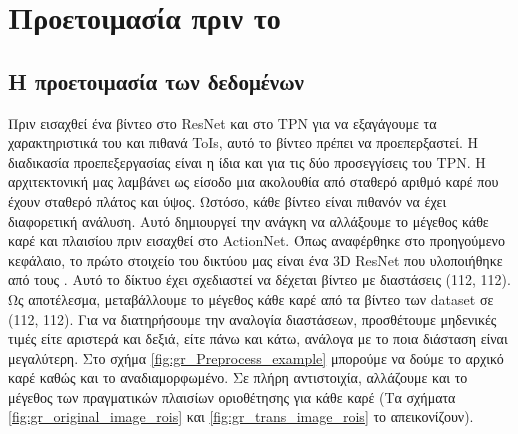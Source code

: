 \section{Προετοιμασία πριν το }

\subsection{Η προετοιμασία των δεδομένων}
Πριν εισαχθεί ένα βίντεο στο  \en ResNet \gr  και στο \en  TPN \gr  για να εξαγάγουμε τα χαρακτηριστικά του και πιθανά \en  ToIs\gr , αυτό το βίντεο πρέπει να προεπερξαστεί.
Η διαδικασία προεπεξεργασίας είναι η ίδια και για τις δύο προσεγγίσεις του \en TPN\gr.
Η αρχιτεκτονική μας λαμβάνει ως είσοδο μια ακολουθία από σταθερό αριθμό καρέ  που έχουν σταθερό πλάτος και ύψος. Ωστόσο, κάθε βίντεο είναι πιθανόν να έχει διαφορετική ανάλυση. Αυτό δημιουργεί
την ανάγκη να αλλάξουμε  το μέγεθος κάθε καρέ και πλαισίου πριν εισαχθεί στο \en ActionNet\gr. Όπως αναφέρθηκε στο προηγούμενο κεφάλαιο, το πρώτο στοιχείο του δικτύου μας είναι ένα \en  3D ResNet  \gr
που υλοποιήθηκε από τους \en  \cite{hara3dcnns}\gr. Αυτό το δίκτυο έχει σχεδιαστεί να δέχεται βίντεο  με διαστάσεις (112, 112).
Ως αποτέλεσμα, μεταβάλλουμε  το μέγεθος κάθε καρέ από τα βίντεο των \en dataset \gr σε (112, 112). Για να διατηρήσουμε την αναλογία διαστάσεων, προσθέτουμε μηδενικές τιμές είτε
αριστερά και δεξιά, είτε πάνω και κάτω, ανάλογα με το ποια διάσταση είναι μεγαλύτερη. Στο σχήμα  \en\ref{fig:gr_Preprocess_example} \gr μπορούμε να δούμε το αρχικό καρέ καθώς και το αναδιαμορφωμένο.
Σε πλήρη αντιστοιχία, αλλάζουμε και το μέγεθος των πραγματικών πλαισίων οριοθέτησης για κάθε καρέ (Τα σχήματα
\en\ref{fig:gr_original_image_rois} \gr   και \en\ref{fig:gr_trans_image_rois} \gr  το απεικονίζουν).


